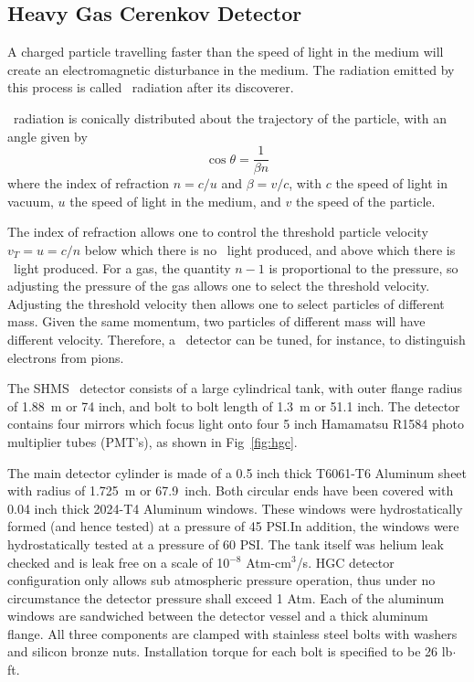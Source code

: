 \subsection{Heavy Gas Cerenkov Detector}

A charged particle travelling faster
than the speed of light in the medium will create an electromagnetic
disturbance in the medium. The radiation emitted by this process is
called \Cerenkov\ radiation after its discoverer.

\Cerenkov\ radiation is conically distributed about the trajectory of the
particle, with an angle given by
$$
	\cos{\theta} = \frac{1}{\beta n}
$$
where the index of refraction $n = c/u$ and $\beta = v/c$, with $c$
the speed of light in vacuum, $u$ the speed of light in the medium,
and $v$ the speed of the particle.

The index of refraction allows one to control the threshold particle velocity 
$v_{T}=u=c/n$ below which there is no \Cerenkov\ light produced, and above which there 
is \Cerenkov\ light produced.  For a gas, the quantity $n-1$ is proportional to the pressure, 
so adjusting the pressure of the gas allows one to select the
threshold velocity. Adjusting the threshold velocity then allows one to select particles of
different mass.  Given the same momentum, two particles of different mass
will have different velocity.  Therefore, a \Cerenkov\ detector can be tuned,
for instance, to distinguish electrons from pions.



The SHMS \Cerenkov\ detector consists of a large cylindrical tank,
with outer flange radius of 1.88~m or 74 inch, and bolt to bolt length
of 1.3~m or 51.1 inch. The detector contains four mirrors which focus
light onto four 5 inch Hamamatsu R1584 photo multiplier tubes (PMT's),
as shown in Fig~\ref{fig:hgc}.


The main detector cylinder is made of a 0.5 inch thick T6061-T6
Aluminum sheet with radius of 1.725~m or 67.9~inch. Both circular ends
have been covered with 0.04 inch thick 2024-T4 Aluminum windows. These
windows were hydrostatically formed (and hence tested) at a pressure
of 45 PSI.In addition, the windows were hydrostatically tested at a
pressure of 60 PSI. The tank itself was helium leak checked and is
leak free on a scale of 10$^{-8}$ Atm-cm$^3$/s. HGC detector
configuration only allows sub atmospheric pressure operation, thus
under no circumstance the detector pressure shall exceed 1 Atm. Each
of the aluminum windows are sandwiched between the detector vessel and
a thick aluminum flange. All three components are clamped with
stainless steel bolts with washers and silicon bronze
nuts. Installation torque for each bolt is specified to be 26
lb$\cdot$ft.

